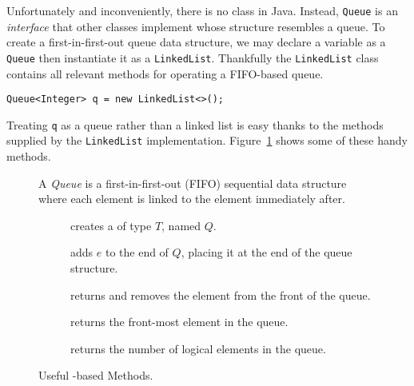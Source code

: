 Unfortunately and inconveniently, there is no  class in Java. Instead, \texttt{Queue} is an \textit{interface} that other classes implement whose structure resembles a queue. To create a first-in-first-out queue data structure, we may declare a variable as a \texttt{Queue} then instantiate it as a \texttt{LinkedList}. Thankfully the \texttt{LinkedList} class contains all relevant methods for operating a FIFO-based queue.
\par{
\begin{verbatim}
Queue<Integer> q = new LinkedList<>();
\end{verbatim}
}
Treating \texttt{q} as a queue rather than a linked list is easy thanks to the methods supplied by the \texttt{LinkedList} implementation. Figure~\ref{fig:queues} shows some of these handy methods. 
\begin{figure}[tp]
  \small
  \begin{tcolorbox}[title=Java Queue]
    A \textit{Queue} is a first-in-first-out (FIFO) sequential data structure where each element is linked to the element immediately after.
    \vspace{2ex}
  \begin{description}
    \item [] creates a  of type $T$, named $Q$.
     \item [] adds $e$ to the end of $Q$, placing it at the end of the queue structure.
     \item [] returns and removes the element from the front of the queue.
     \item [] returns the front-most element in the queue.
    \item [] returns the number of logical elements in the queue.
  \end{description}
\end{tcolorbox}
  \caption{Useful -based Methods.}
  \label{fig:queues}
\end{figure}


